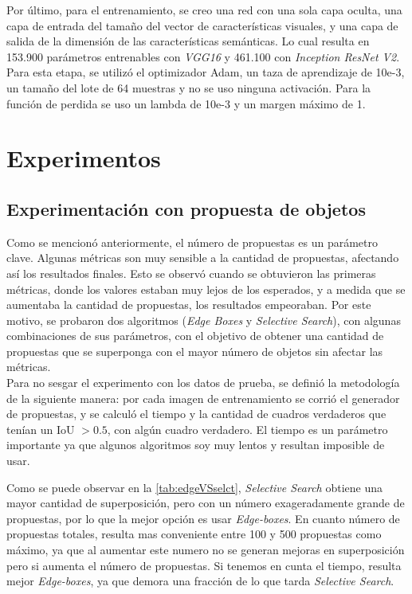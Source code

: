 Por último, para el entrenamiento, se creo una red con una sola capa oculta, una capa de entrada del tamaño del vector de características visuales, y una capa de salida de la dimensión de las características semánticas. Lo cual resulta en 153.900 parámetros entrenables con \textit{VGG16} y 461.100 con \textit{Inception ResNet V2}. Para esta etapa, se utilizó el optimizador Adam, un taza de aprendizaje de 10e-3, un tamaño del lote de 64 muestras y no se uso ninguna activación. Para la función de perdida se uso un lambda de 10e-3 y un margen máximo de 1.\\


\section{Experimentos}\label{cap:experimentos}

\subsection{Experimentación con propuesta de objetos} \label{ssec:experimentacionconpropuestadeobjetos}
Como se mencionó anteriormente, el número de propuestas es un parámetro clave. Algunas métricas son muy sensible a la cantidad de propuestas, afectando así los resultados finales. Esto se observó cuando se obtuvieron las primeras métricas, donde los valores estaban muy lejos de los esperados, y a medida que se aumentaba la cantidad de propuestas, los resultados empeoraban. Por este motivo, se probaron dos algoritmos (\textit{Edge Boxes} y \textit{Selective Search}), con algunas combinaciones de sus parámetros, con el objetivo de obtener una cantidad de propuestas que se superponga con el mayor número de objetos sin afectar las métricas.\\

Para no sesgar el experimento con los datos de prueba, se definió la metodología de la siguiente manera: por cada imagen de entrenamiento se corrió el generador de propuestas, y se calculó el tiempo y la cantidad de cuadros verdaderos que tenían un IoU $> 0.5$, con algún cuadro verdadero. El tiempo es un parámetro importante ya que algunos algoritmos soy muy lentos y resultan imposible de usar. 

Como se puede observar en la \autoref{tab:edgeVSselct}, \textit{Selective Search} obtiene una mayor cantidad de superposición, pero con un número exageradamente grande de propuestas, por lo que la mejor opción es usar \textit{Edge-boxes}. En cuanto número de propuestas totales, resulta mas conveniente entre 100 y 500 propuestas como máximo, ya que al aumentar este numero no se generan mejoras en superposición pero si aumenta el número de propuestas. Si tenemos en cunta el tiempo, resulta mejor \textit{Edge-boxes}, ya que demora una fracción de lo que tarda \textit{Selective Search}.\\

